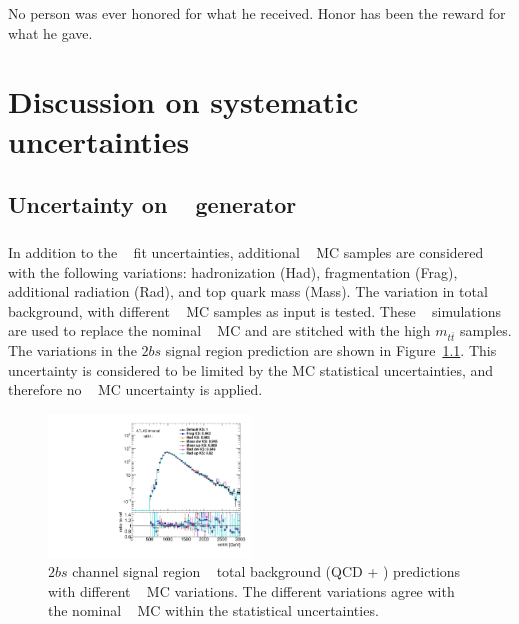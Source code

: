 \begin{savequote}[75mm]
No person was ever honored for what he received. Honor has been the reward for what he gave.   
\end{savequote}
\chapter{Discussion on systematic uncertainties}
\label{app:appendixSys}

\section{Uncertainty on \ttbar~ generator}
\label{sec:ttbar-mc-unc}

\paragraph{}
In addition to the \ttbar~ fit uncertainties, additional \ttbar~ MC samples are considered with the following variations: hadronization (Had), fragmentation (Frag), additional radiation (Rad), and top quark mass (Mass).
The variation in total background, with different \ttbar~ MC samples as input is tested.
These \ttbar~ simulations are used to replace the nominal \ttbar~ MC and are stitched with the high $m_{t\bar{t}}$ samples. 
The variations in the $2bs$ signal region prediction are shown in Figure~\ref{fig:ttbar-MC}. 
This uncertainty is considered to be limited by the MC statistical uncertainties, and therefore no \ttbar~ MC uncertainty is applied.

\begin{figure}[htb!]
\begin{center} 
\includegraphics[width=0.48\textwidth,angle=-90]{figures/boosted/Other/directcompare_mHH_l_1_TwoTag_split_Top_syst_stat_postfit_all_.pdf}
\caption{$2bs$ channel signal region \mtwoJ~ total background (QCD + \ttbar) predictions with different \ttbar~ MC variations. The different variations agree with the nominal \ttbar~ MC within the statistical uncertainties.}
\label{fig:ttbar-MC}
\end{center}
\end{figure}

